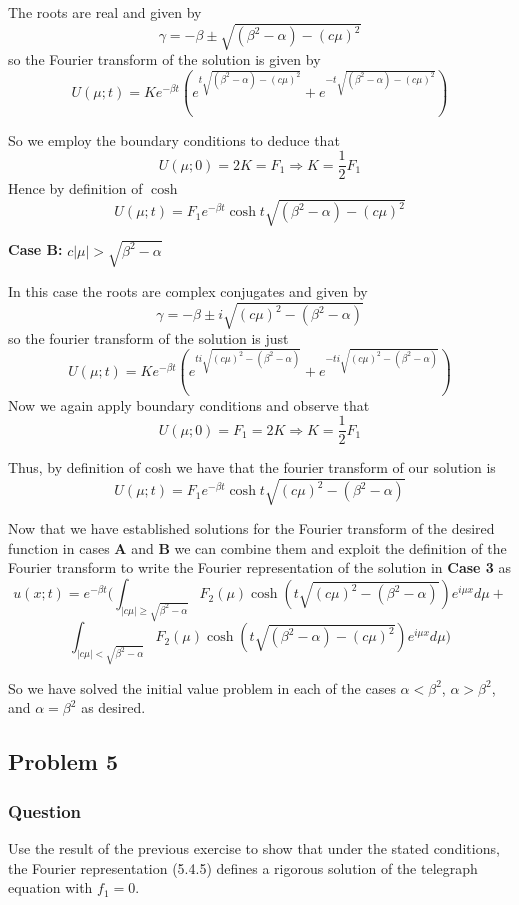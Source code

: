 \documentclass[12pt]{article}
\begin{document}
The roots are real and given by 
\[\gamma= -\beta \pm \sqrt{(\beta^2-\alpha)-(c \mu)^2}\]
so the Fourier transform of the solution is given by 
\[U(\mu;t)=K e^{-\beta t} \left( e^{t \sqrt{(\beta^2-\alpha)-(c \mu)^2} } + e^{-t \sqrt{(\beta^2-\alpha)-(c \mu)^2} } \right)\]

So we employ the boundary conditions to deduce that
\[U(\mu;0)= 2 K =F_1 \Rightarrow K= \frac{1}{2} F_1 \]
Hence by definition of $\cosh$
\[U(\mu;t)=F_1 e^{-\beta t}  \cosh{t \sqrt{(\beta^2-\alpha)-(c\mu)^2}} \]

\textbf{Case B: } $c|\mu| > \sqrt{\beta^2 - \alpha}$

In this case the roots are complex conjugates and given by 
\[\gamma = -\beta \pm i \sqrt{(c \mu)^2-(\beta^2-\alpha)}\]
so the fourier transform of the solution is just
\[U(\mu;t)= K e^{-\beta t}\left( e^{t i \sqrt{(c \mu)^2-(\beta^2-\alpha)}}  + e^{-t i \sqrt{(c \mu)^2-(\beta^2-\alpha)}} \right)\]
Now we again apply boundary conditions and observe that 
\[U(\mu;0)= F_1= 2 K \Rightarrow K = \frac{1}{2} F_1 \]

Thus, by definition of cosh we have that the fourier transform of our solution is 
\[U(\mu;t)=F_1 e^{-\beta t} \cosh{t \sqrt{(c\mu)^2-(\beta^2-\alpha)}}\]

Now that we have established solutions for the Fourier transform of the desired function in cases \textbf{A} and \textbf{B} we can combine them and exploit the definition of the Fourier transform to write the Fourier representation of the solution in \textbf{Case 3} as
\[u(x;t)=e^{-\beta t} ( \int_{|c \mu| \geq \sqrt{\beta^2 - \alpha}} F_2(\mu) \cosh{\left(t\sqrt{(c\mu)^2-(\beta^2-\alpha)}\right)} e^{i \mu x} d\mu + \]
\[\int_{|c \mu| < \sqrt{\beta^2 - \alpha}} F_2(\mu) \cosh{\left(t\sqrt{(\beta^2-\alpha)-(c\mu)^2}\right)} e^{i \mu x} d\mu )\]

So we have solved the initial value problem in each of the cases  $\alpha<\beta^2$, $\alpha>\beta^2$, and $\alpha=\beta^2$ as desired.




\subsection{Problem 5}
\subsubsection{Question}
Use the result of the previous exercise to show that under the stated conditions, the Fourier representation (5.4.5) defines a rigorous solution of the telegraph equation with $f_1=0$.
\end{document}
